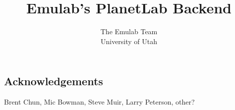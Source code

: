 \documentclass[11pt]{article}
\title{Emulab's PlanetLab Backend}
\author{The Emulab Team\\[1ex]
	University of Utah
}
\begin{document}
\maketitle









	




\subsection*{Acknowledgements}
Brent Chun, Mic Bowman, Steve Muir, Larry Peterson, other?


{\footnotesize
\itemsep=0pt
}
\end{document}

